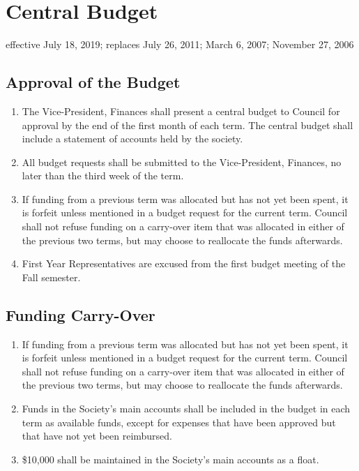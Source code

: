 \section{Central Budget}
effective July 18, 2019; replaces July 26, 2011; March 6, 2007; November 27, 2006

\subsection{Approval of the Budget}
\begin{enumerate}
\item The Vice-President, Finances shall present a central budget to Council for approval by the end of the first month of each term. The central budget shall include a statement of accounts held by the society.
\item All budget requests shall be submitted to the Vice-President, Finances, no later than the third week of the term.
\item If funding from a previous term was allocated but has not yet been spent, it is forfeit unless mentioned in a budget request for the current term. Council shall not refuse funding on a carry-over item that was allocated in either of the previous two terms, but may choose to reallocate the funds afterwards.
\item First Year Representatives are excused from the first budget meeting of the Fall semester.
\end{enumerate}


\subsection{Funding Carry-Over}
\begin{enumerate}
\item If funding from a previous term was allocated but has not yet been spent, it is forfeit unless mentioned in a budget request for the current term. Council shall not refuse funding on a carry-over item that was allocated in either of the previous two terms, but may choose to reallocate the funds afterwards.
\item Funds in the Society's main accounts shall be included in the budget in each term as available funds, except for expenses that have been approved but that have not yet been reimbursed.
\item \$10,000 shall be maintained in the Society's main accounts as a float.
\end{enumerate}


